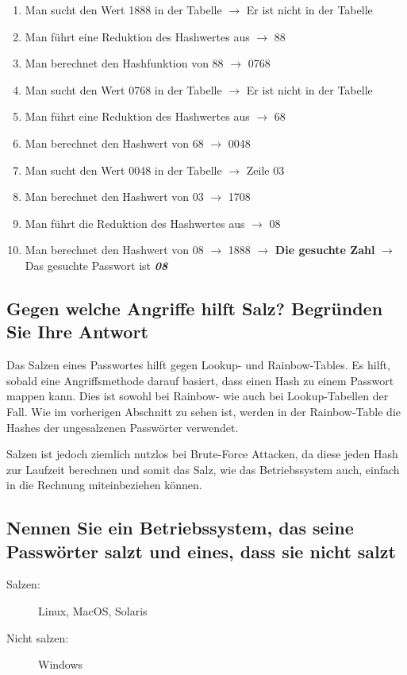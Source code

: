 \documentclass[a4paper, 11pt, nofootinbib]{article}
\begin{document}
\begin{enumerate}
	\item Man sucht den Wert 1888 in der Tabelle $\rightarrow$ Er ist nicht in der Tabelle
	\item Man führt eine Reduktion des Hashwertes aus $\rightarrow$ 88
	\item Man berechnet den Hashfunktion von 88 $\rightarrow$ 0768
	\item Man sucht den Wert 0768 in der Tabelle $\rightarrow$ Er ist nicht in der Tabelle
	\item Man führt eine Reduktion des Hashwertes aus $\rightarrow$ 68
	\item Man berechnet den Hashwert von 68 $\rightarrow$ 0048
	\item Man sucht den Wert 0048 in der Tabelle $\rightarrow$ Zeile 03
	\item Man berechnet den Hashwert von 03 $\rightarrow$ 1708
	\item Man führt die Reduktion des Hashwertes aus $\rightarrow$ 08
	\item Man berechnet den Hashwert von 08 $\rightarrow$ 1888 $\rightarrow$ \textbf{Die gesuchte Zahl} $\rightarrow$ Das gesuchte Passwort ist \textit{\textbf{08}}
\end{enumerate}

\subsection{Gegen welche Angriffe hilft Salz? Begründen Sie Ihre Antwort}
Das Salzen eines Passwortes hilft gegen Lookup- und Rainbow-Tables. Es hilft, sobald eine Angriffsmethode darauf basiert, dass einen Hash zu einem Passwort mappen kann. Dies ist sowohl bei Rainbow- wie auch bei Lookup-Tabellen der Fall. Wie im vorherigen Abschnitt zu sehen ist, werden in der Rainbow-Table die Hashes der ungesalzenen Passwörter verwendet.

Salzen ist jedoch ziemlich nutzlos bei Brute-Force Attacken, da diese jeden Hash zur Laufzeit berechnen und somit das Salz, wie das Betriebssystem auch, einfach in die Rechnung miteinbeziehen können.

\subsection{Nennen Sie ein Betriebssystem, das seine Passwörter salzt und eines, dass sie nicht salzt}
\begin{description}
	\item[Salzen: ] Linux, MacOS, Solaris
	\item[Nicht salzen: ] Windows
\end{description}
\end{document}
